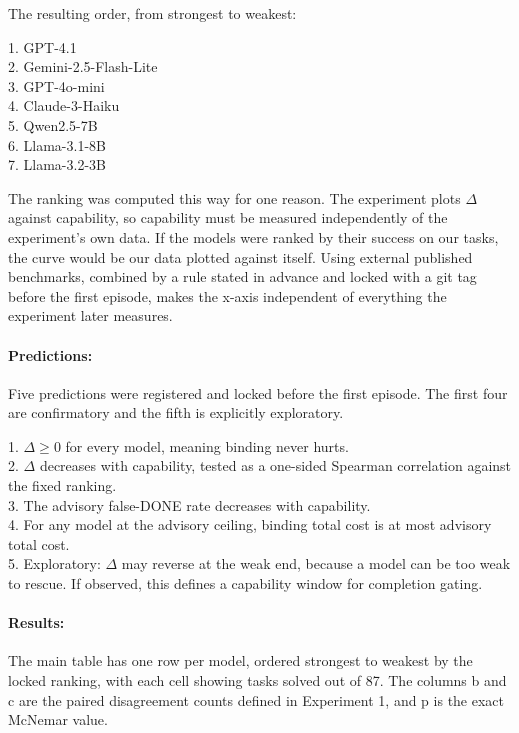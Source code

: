 The resulting order, from strongest to weakest:

1. GPT-4.1\\
2. Gemini-2.5-Flash-Lite\\
3. GPT-4o-mini\\
4. Claude-3-Haiku\\
5. Qwen2.5-7B\\
6. Llama-3.1-8B\\
7. Llama-3.2-3B

The ranking was computed this way for one reason. The experiment plots $\Delta$ against capability, so capability must be measured independently of the experiment's own data. If the models were ranked by their success on our tasks, the curve would be our data plotted against itself. Using external published benchmarks, combined by a rule stated in advance and locked with a git tag before the first episode, makes the x-axis independent of everything the experiment later measures.

\paragraph{Predictions:} Five predictions were registered and locked before the first episode. The first four are confirmatory and the fifth is explicitly exploratory.

1. $\Delta \geq 0$ for every model, meaning binding never hurts.\\
2. $\Delta$ decreases with capability, tested as a one-sided Spearman correlation against the fixed ranking.\\
3. The advisory false-DONE rate decreases with capability.\\
4. For any model at the advisory ceiling, binding total cost is at most advisory total cost.\\
5. Exploratory: $\Delta$ may reverse at the weak end, because a model can be too weak to rescue. If observed, this defines a capability window for completion gating.

\paragraph{Results:} The main table has one row per model, ordered strongest to weakest by the locked ranking, with each cell showing tasks solved out of 87. The columns b and c are the paired disagreement counts defined in Experiment 1, and p is the exact McNemar value.

